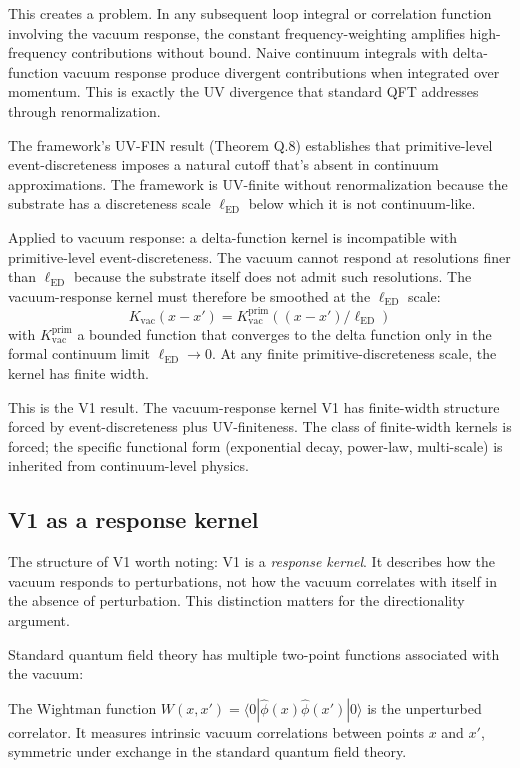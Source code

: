 \documentclass[11pt,a4paper]{article}
\begin{document}
This creates a problem. In any subsequent loop integral or correlation function involving the vacuum response, the constant frequency-weighting amplifies high-frequency contributions without bound. Naive continuum integrals with delta-function vacuum response produce divergent contributions when integrated over momentum. This is exactly the UV divergence that standard QFT addresses through renormalization.

The framework's UV-FIN result (Theorem Q.8) establishes that primitive-level event-discreteness imposes a natural cutoff that's absent in continuum approximations. The framework is UV-finite without renormalization because the substrate has a discreteness scale $\ell_{\mathrm{ED}}$ below which it is not continuum-like.

Applied to vacuum response: a delta-function kernel is incompatible with primitive-level event-discreteness. The vacuum cannot respond at resolutions finer than $\ell_{\mathrm{ED}}$ because the substrate itself does not admit such resolutions. The vacuum-response kernel must therefore be smoothed at the $\ell_{\mathrm{ED}}$ scale:
\[
K_{\mathrm{vac}}(x - x') = K_{\mathrm{vac}}^{\mathrm{prim}}\!\left((x - x') / \ell_{\mathrm{ED}}\right)
\]
with $K_{\mathrm{vac}}^{\mathrm{prim}}$ a bounded function that converges to the delta function only in the formal continuum limit $\ell_{\mathrm{ED}} \to 0$. At any finite primitive-discreteness scale, the kernel has finite width.

This is the V1 result. The vacuum-response kernel V1 has finite-width structure forced by event-discreteness plus UV-finiteness. The class of finite-width kernels is forced; the specific functional form (exponential decay, power-law, multi-scale) is inherited from continuum-level physics.

\subsection{V1 as a response kernel}

The structure of V1 worth noting: V1 is a \emph{response kernel}. It describes how the vacuum responds to perturbations, not how the vacuum correlates with itself in the absence of perturbation. This distinction matters for the directionality argument.

Standard quantum field theory has multiple two-point functions associated with the vacuum:

The Wightman function $W(x, x') = \langle 0|\hat\phi(x)\hat\phi(x')|0\rangle$ is the unperturbed correlator. It measures intrinsic vacuum correlations between points $x$ and $x'$, symmetric under exchange in the standard quantum field theory.
\end{document}
